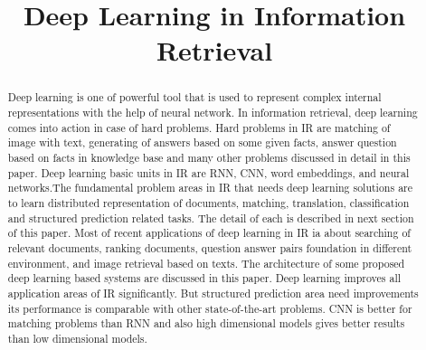 \documentclass{doublecol-new}
\theoremstyle{TH}{
\newtheorem{lemma}{Lemma}
\newtheorem{theorem}[lemma]{Theorem}
\newtheorem{corrolary}[lemma]{Corrolary}
\newtheorem{conjecture}[lemma]{Conjecture}
\newtheorem{proposition}[lemma]{Proposition}
\newtheorem{claim}[lemma]{Claim}
\newtheorem{stheorem}[lemma]{Wrong Theorem}
\newtheorem{algorithm}{Algorithm}
}
\theoremstyle{THrm}{
\newtheorem{definition}{Definition}[section]
\newtheorem{question}{Question}[section]
\newtheorem{remark}{Remark}
\newtheorem{scheme}{Scheme}
}
\theoremstyle{THhit}{
\newtheorem{case}{Case}[section]
}
\begin{document}
%

\setcounter{page}{1}






\BottomCatch



\subtitle{}

\title{Deep Learning in Information Retrieval}

%
%
%
%
%

%
%
%
%
%
%
%


\begin{abstract}
Deep learning is one of powerful tool that is used to represent complex internal representations with the help of neural network. In information retrieval, deep learning comes into action in case of hard problems. Hard problems in IR are matching of image with text, generating of answers based on some given facts, answer question based on facts in knowledge base and many other problems discussed in detail in this paper. Deep learning basic units in IR are RNN, CNN, word embeddings, and neural networks.The fundamental problem areas in IR that needs deep learning solutions are to learn distributed representation of documents, matching, translation, classification and structured prediction related tasks. The detail of each is described in next section of this paper. Most of recent applications of deep learning in IR ia about searching of relevant documents, ranking documents, question answer pairs foundation in different environment, and image retrieval based on texts. The architecture of some proposed deep learning based systems are discussed in this paper. Deep learning improves all application areas of IR significantly. But structured prediction area need improvements its performance is comparable with other state-of-the-art problems. CNN is better for matching problems than RNN and also high dimensional models gives better results than low dimensional models. 
\end{abstract}
\end{document}

